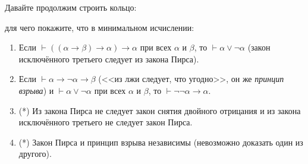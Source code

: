 \documentclass[10pt,a4paper,oneside]{article}
\begin{document}
\begin{enumerate}
Давайте продолжим строить кольцо:

\begin{center}\end{center}

для чего покажите, что в минимальном исчислении:
\begin{enumerate}
\item Если $\vdash((\alpha\rightarrow\beta)\rightarrow\alpha)\rightarrow\alpha$ при всех $\alpha$ и $\beta$, то
$\vdash\alpha\vee\neg\alpha$ (закон исключённого третьего следует из закона Пирса).
\item Если $\vdash\alpha\rightarrow\neg\alpha\rightarrow\beta$ (<<из лжи следует, что угодно>>, 
он же \emph{принцип взрыва}) и $\vdash\alpha\vee\neg\alpha$ при всех $\alpha$ и $\beta$, то $\vdash\neg\neg\alpha\rightarrow\alpha$.
\item (*) Из закона Пирса не следует закон снятия двойного отрицания и из закона исключённого третьего не следует закон Пирса.
\item (*) Закон Пирса и принцип взрыва независимы (невозможно доказать один из другого).
\end{enumerate}

\end{enumerate}
\end{document}
